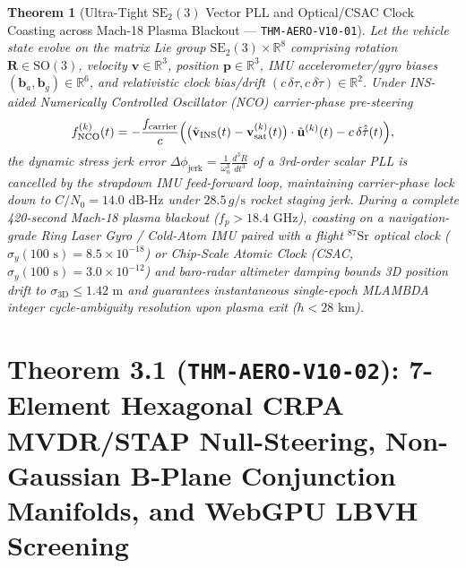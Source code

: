 \documentclass[11pt,a4paper]{article}
\theoremstyle{plain}
\newtheorem{theorem}{Theorem}[section]
\theoremstyle{definition}
\theoremstyle{remark}
\begin{document}
\begin{theorem}[Ultra-Tight $\text{SE}_2(3)$ Vector PLL and Optical/CSAC Clock Coasting across Mach-18 Plasma Blackout --- \texttt{THM-AERO-V10-01}]\label{thm:aero_v10_plasma_vtl}
Let the vehicle state evolve on the matrix Lie group $\text{SE}_2(3) \times \mathbb{R}^8$ comprising rotation $\mathbf{R} \in \text{SO}(3)$, velocity $\mathbf{v} \in \mathbb{R}^3$, position $\mathbf{p} \in \mathbb{R}^3$, IMU accelerometer/gyro biases $(\mathbf{b}_a, \mathbf{b}_g) \in \mathbb{R}^6$, and relativistic clock bias/drift $(c\,\delta\tau, c\,\delta\dot{\tau}) \in \mathbb{R}^2$. Under INS-aided Numerically Controlled Oscillator (NCO) carrier-phase pre-steering
\begin{equation}\label{eq:vtl_nco_presteer}
  f_{\text{NCO}}^{(k)}(t) = -\frac{f_{\text{carrier}}}{c}\Bigl(\bigl(\hat{\mathbf{v}}_{\text{INS}}(t) - \mathbf{v}_{\text{sat}}^{(k)}(t)\bigr)\cdot \hat{\mathbf{u}}^{(k)}(t) - c\,\delta\hat{\dot{\tau}}(t)\Bigr),
\end{equation}
the dynamic stress jerk error $\Delta\phi_{\text{jerk}} = \frac{1}{\omega_n^3}\frac{d^3 R}{dt^3}$ of a 3rd-order scalar PLL is cancelled by the strapdown IMU feed-forward loop, maintaining carrier-phase lock down to $C/N_0 = 14.0\text{ dB-Hz}$ under $28.5\,g/\text{s}$ rocket staging jerk. During a complete 420-second Mach-18 plasma blackout ($f_p > 18.4\text{ GHz}$), coasting on a navigation-grade Ring Laser Gyro / Cold-Atom IMU paired with a flight $^{87}\text{Sr}$ optical clock ($\sigma_y(100\text{ s}) = 8.5\times 10^{-18}$) or Chip-Scale Atomic Clock (CSAC, $\sigma_y(100\text{ s}) = 3.0\times 10^{-12}$) and baro-radar altimeter damping bounds 3D position drift to $\sigma_{3\text{D}} \le 1.42\text{ m}$ and guarantees instantaneous single-epoch MLAMBDA integer cycle-ambiguity resolution upon plasma exit ($h < 28\text{ km}$).
\end{theorem}

\section{\texorpdfstring{Theorem 3.1 (\texttt{THM-AERO-V10-02}): 7-Element Hexagonal CRPA MVDR/STAP Null-Steering, Non-Gaussian B-Plane Conjunction Manifolds, and WebGPU LBVH Screening}{Theorem 3.1 (THM-AERO-V10-02): 7-Element Hexagonal CRPA MVDR/STAP Null-Steering, Non-Gaussian B-Plane Conjunction Manifolds, and WebGPU LBVH Screening}}
\end{document}
